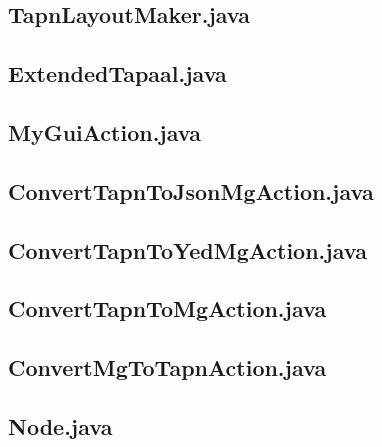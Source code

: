 \documentclass{../TechDoc}
\begin{document}
	\subsection{TapnLayoutMaker.java}
	
	\subsection{ExtendedTapaal.java}
	
	\subsection{MyGuiAction.java}
	
	\subsection{ConvertTapnToJsonMgAction.java}
	
	\subsection{ConvertTapnToYedMgAction.java}
	
	\subsection{ConvertTapnToMgAction.java}
	
	\subsection{ConvertMgToTapnAction.java}
	
	\subsection{Node.java}
	
\end{document}
